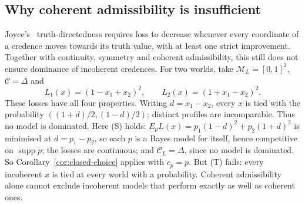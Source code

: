 \documentclass[11pt]{article}
\theoremstyle{definition}
\newcommand{\M}{\mathcal M}
\newcommand{\C}{\mathcal C}
\newcommand{\supp}{\operatorname{supp}}
\begin{document}
\subsection{Why coherent admissibility is insufficient}
Joyce's~\cite{Joyce2009} truth-directedness requires loss to decrease whenever every coordinate of a credence moves towards its truth value, with at least one strict improvement. Together with continuity, symmetry and coherent admissibility, this still does not ensure dominance of incoherent credences. For two worlds, take $\M_L=[0,1]^2$, $\C=\Delta$ and
\[
L_1(x)=(1-x_1+x_2)^2,\qquad L_2(x)=(1+x_1-x_2)^2.
\]
These losses have all four properties. Writing $d=x_1-x_2$, every $x$ is tied with the probability $((1+d)/2,(1-d)/2)$; distinct profiles are incomparable. Thus no model is dominated. {\color{red}Here (S) holds: $E_pL(x)=p_1(1-d)^2+p_2(1+d)^2$ is minimised at $d=p_1-p_2$, so each $p$ is a Bayes model for itself, hence competitive on $\supp p$; the losses are continuous; and $\C_L=\Delta$, since no model is dominated. So Corollary~\ref{cor:closed-choice} applies with $c_p=p$. But (T) fails: every incoherent $x$ is tied at every world with a probability.} Coherent admissibility alone cannot exclude incoherent models that perform exactly as well as coherent ones.
\end{document}
